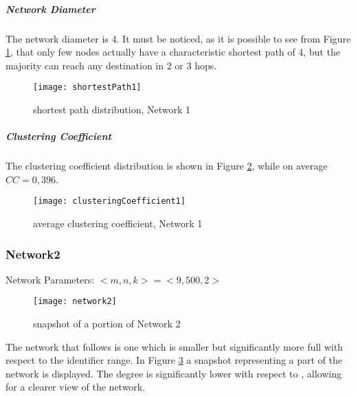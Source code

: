 \documentclass[11pt, a4paper]{report}
\begin{document}
\subparagraph*{Network Diameter}
	The network diameter is 4. It must be noticed, as it is possible to see from Figure \ref{fig:shortestPath1}, that only few nodes actually have a characteristic shortest path of 4, but the majority can reach any destination in 2 or 3 hops.
	\begin{figure}[H]
		\centering
		\texttt{[image: shortestPath1]}
		\caption{shortest path distribution, Network 1}
		\label{fig:shortestPath1}
	\end{figure}

\subparagraph*{Clustering Coefficient}	
	The clustering coefficient distribution is shown in Figure \ref{fig:clusteringCoefficient1}, while on average $CC = 0,396$.
	\begin{figure}[H]
		\centering
		\texttt{[image: clusteringCoefficient1]}
		\caption{average clustering coefficient, Network 1}
		\label{fig:clusteringCoefficient1}
	\end{figure}

\subsubsection*{Network2}
\label{sec:network2}
	Network Parameters: $<\!m, n, k\!> = <\!9, 500, 2\!>$
	\begin{figure}[H]
		\centering
		\texttt{[image: network2]}
		\caption{snapshot of a portion of Network 2}
		\label{fig:network2}
	\end{figure}
	\par
	The network that follows is one which is smaller but significantly more full with respect to the identifier range. In Figure \ref{fig:network2} a snapshot representing a part of the network is displayed. The degree is significantly lower with respect to , allowing for a clearer view of the network.
	
\end{document}
